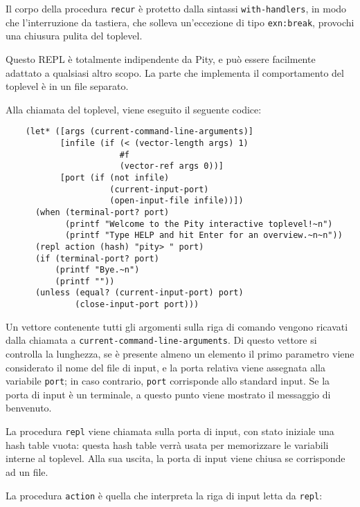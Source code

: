 Il corpo della procedura \lstinline{recur} \`e protetto dalla sintassi
\lstinline{with-handlers}, in modo che l'interruzione da tastiera,
che solleva un'eccezione di tipo \lstinline{exn:break}, provochi
una chiusura pulita del toplevel.

Questo REPL \`e totalmente indipendente da Pity, e pu\`o essere
facilmente adattato a qualsiasi altro scopo. La parte che implementa il
comportamento del toplevel \`e in un file separato.

Alla chiamata del toplevel, viene eseguito il seguente codice:

\begin{lstlisting}
    (let* ([args (current-command-line-arguments)]
           [infile (if (< (vector-length args) 1)
                       #f
                       (vector-ref args 0))]
           [port (if (not infile)
                     (current-input-port)
                     (open-input-file infile))])
      (when (terminal-port? port)
            (printf "Welcome to the Pity interactive toplevel!~n")
            (printf "Type HELP and hit Enter for an overview.~n~n"))
      (repl action (hash) "pity> " port)
      (if (terminal-port? port)
          (printf "Bye.~n")
          (printf ""))
      (unless (equal? (current-input-port) port)
              (close-input-port port)))
\end{lstlisting}

Un vettore contenente tutti gli argomenti sulla riga di comando vengono
ricavati dalla chiamata a \lstinline{current-command-line-arguments}. Di
questo vettore si controlla la lunghezza, se \`e presente almeno un
elemento il primo parametro viene considerato il nome del file di input,
e la porta relativa viene assegnata alla variabile \lstinline{port}; in
caso contrario, \lstinline{port} corrisponde allo standard input. Se la
porta di input \`e un terminale, a questo punto viene mostrato il
messaggio di benvenuto.

La procedura \lstinline{repl} viene chiamata sulla porta di input, con
stato iniziale una hash table vuota: questa hash table verr\`a usata per
memorizzare le variabili interne al toplevel. Alla sua uscita, la porta
di input viene chiusa se corrisponde ad un file.

La procedura \lstinline{action} \`e quella che interpreta la riga di
input letta da \lstinline{repl}:

